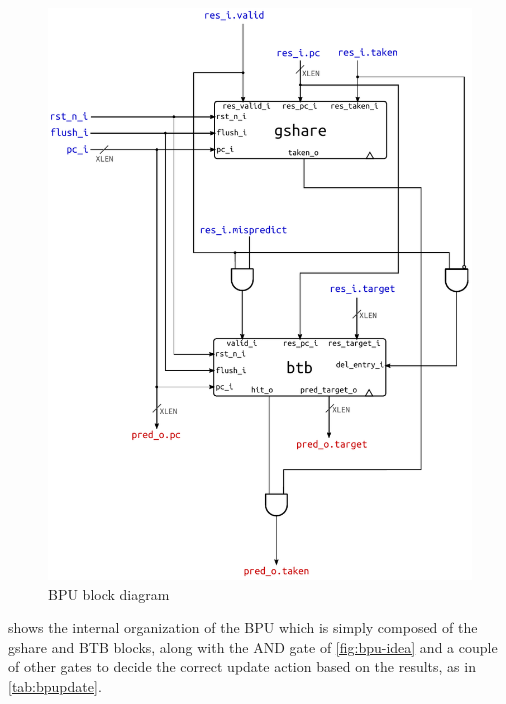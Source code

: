 \begin{figure}[!h]
  \centering
  \includegraphics[width=\textwidth]{img/bpu.pdf}
  \caption{\acs{BPU} block diagram}
  \label{fig:bpu}
\end{figure}
 shows the internal organization of the \ac{BPU} which is simply composed of the gshare and \ac{BTB} blocks, along with the AND gate of \cref{fig:bpu-idea} and a couple of other gates to decide the correct update action based on the results, as in \cref{tab:bpupdate}.

